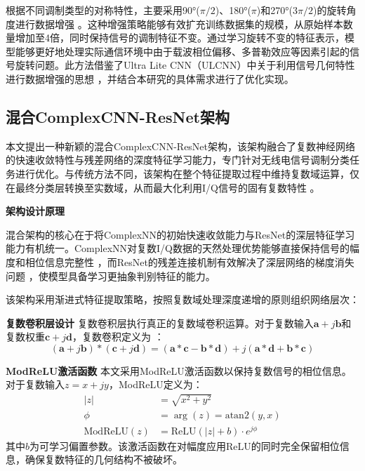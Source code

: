 \documentclass[conference]{IEEEtran}
\begin{document}
根据不同调制类型的对称特性，主要采用90°($\pi/2$)、180°($\pi$)和270°($3\pi/2$)的旋转角度进行数据增强 \cite{b1}\cite{b1}。这种增强策略能够有效扩充训练数据集的规模，从原始样本数量增加至4倍，同时保持信号的调制特征不变。通过学习旋转不变的特征表示，模型能够更好地处理实际通信环境中由于载波相位偏移、多普勒效应等因素引起的信号旋转问题。此方法借鉴了Ultra Lite CNN（ULCNN）\cite{b1}中关于利用信号几何特性进行数据增强的思想 \cite{[23_MISSING]}\cite{b1}，并结合本研究的具体需求进行了优化实现。

\subsection{混合ComplexCNN-ResNet架构}

本文提出一种新颖的混合ComplexCNN-ResNet架构，该架构融合了复数神经网络的快速收敛特性与残差网络的深度特征学习能力，专门针对无线电信号调制分类任务进行优化。与传统方法不同，该架构在整个特征提取过程中维持复数域运算，仅在最终分类层转换至实数域，从而最大化利用I/Q信号的固有复数特性 \cite{b1}\cite{b4}。

\textbf{架构设计原理}

混合架构的核心在于将ComplexNN的初始快速收敛能力与ResNet的深层特征学习能力有机统一。ComplexNN对复数I/Q数据的天然处理优势能够直接保持信号的幅度和相位信息完整性 \cite{b4}，而ResNet的残差连接机制有效解决了深层网络的梯度消失问题 \cite{[13]}\cite{[14_MISSING]}，使模型具备学习更抽象判别特征的能力。

该架构采用渐进式特征提取策略，按照复数域处理深度递增的原则组织网络层次：

\textbf{复数卷积层设计} 复数卷积层执行真正的复数域卷积运算。对于复数输入$\mathbf{a} + j\mathbf{b}$和复数权重$\mathbf{c} + j\mathbf{d}$，复数卷积定义为 \cite{b4}\cite{b4}：
\begin{equation}
(\mathbf{a} + j\mathbf{b}) * (\mathbf{c} + j\mathbf{d}) = 
(\mathbf{a} * \mathbf{c} - \mathbf{b} * \mathbf{d})
+ j(\mathbf{a} * \mathbf{d} + \mathbf{b} * \mathbf{c})
\end{equation}

\textbf{ModReLU激活函数} 本文采用ModReLU激活函数以保持复数信号的相位信息。对于复数输入$z = x + jy$，ModReLU定义为：
\begin{align}
|z|
&= \sqrt{x^2 + y^2} \\
\phi &= \arg(z) = \mathrm{atan2}(y,x) \\
\text{ModReLU}(z) &= \text{ReLU}(|z| + b) \cdot e^{j\phi}
\end{align}
其中$b$为可学习偏置参数。该激活函数在对幅度应用ReLU的同时完全保留相位信息，确保复数特征的几何结构不被破坏。
\end{document}
